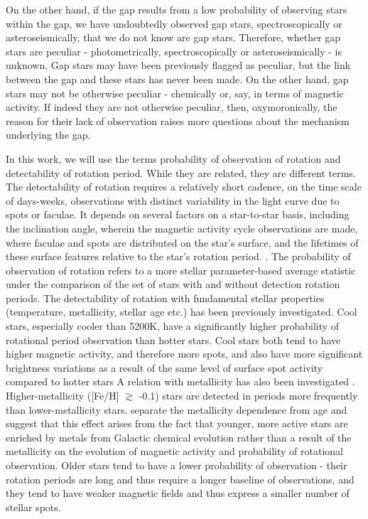 On the other hand, if the gap results from a low probability of observing stars within the gap, we have undoubtedly observed gap stars, spectroscopically or asteroseismically, that we do not know are gap stars.
Therefore, whether gap stars are peculiar - photometrically, spectroscopically or asteroseismically - is unknown.
Gap stars may have been previously flagged as peculiar, but the link between the gap and these stars has never been made.
On the other hand, gap stars may not be otherwise peculiar - chemically or, say, in terms of magnetic activity.
If indeed they are not otherwise peculiar, then, oxymoronically, the reason for their lack of observation raises more questions about the mechanism underlying the gap.

In this work, we will use the terms probability of observation of rotation and detectability of rotation period.
While they are related, they are different terms.
The detectability of rotation requires a relatively short cadence, on the time scale of days-weeks, observations with distinct variability in the light curve due to spots or faculae.
It depends on several factors on a star-to-star basis, including the inclination angle, wherein the magnetic activity cycle observations are made, where faculae and spots are distributed on the star's surface, and the lifetimes of these surface features relative to the star's rotation period. \citep{aigrain_hare_2015, reinhold_transition_2019, reinhold_where_2021}.
The probability of observation of rotation refers to a more stellar parameter-based average statistic under the comparison of the set of stars with and without detection rotation periods.
The detectability of rotation with fundamental stellar properties (temperature, metallicity, stellar age etc.) has been previously investigated.
Cool stars, especially cooler than 5200K, have a significantly higher probability of rotational period observation than hotter stars.
Cool stars both tend to have higher magnetic activity, and therefore more spots, and also have more significant brightness variations as a result of the same level of surface spot activity compared to hotter stars \citep{ mcquillan_rotation_2014, santos_surface_2021, zhang_magnetic_2020}
A relation with metallicity has also been investigated \citep{amard_evidence_2020,see_photometric_2021,claytor_tess_2023}.
Higher-metallicity ([Fe/H] $\gtrsim$ -0.1) stars are detected in periods more frequently than lower-metallicity stars.
 \citep{avallone_rotation_2022, masuda_detectability_2022} separate the metallicity dependence from age and suggest that this effect arises from the fact that younger, more active stars are enriched by metals from Galactic chemical evolution rather than a result of the metallicity on the evolution of magnetic activity and probability of rotational observation.
Older stars tend to have a lower probability of observation - their rotation periods are long and thus require a longer baseline of observations, and they tend to have weaker magnetic fields and thus express a smaller number of stellar spots.

